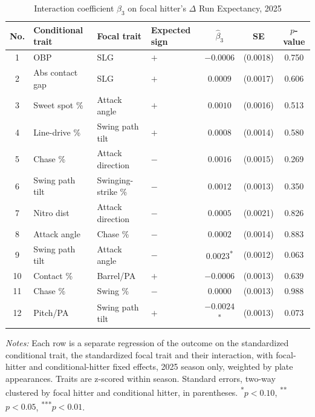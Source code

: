 \begin{table}[htbp]
\centering
\small
\caption{Interaction coefficient $\beta_3$ on focal hitter's $\Delta$ Run Expectancy, 2025}
\label{tab:table1_focal_2025}
\begin{tabular}{clllccc}
\toprule
No. & Conditional trait & Focal trait & Expected sign & $\hat\beta_3$ & SE & $p$-value \\
\midrule
1 & OBP & SLG & $+$ & $-0.0006$ & (0.0018) & 0.750 \\
2 & Abs contact gap & SLG & $+$ & $0.0009$ & (0.0017) & 0.606 \\
3 & Sweet spot \% & Attack angle & $+$ & $0.0010$ & (0.0016) & 0.513 \\
4 & Line-drive \% & Swing path tilt & $+$ & $0.0008$ & (0.0014) & 0.580 \\
5 & Chase \% & Attack direction & $-$ & $0.0016$ & (0.0015) & 0.269 \\
6 & Swing path tilt & Swinging-strike \% & $-$ & $0.0012$ & (0.0013) & 0.350 \\
7 & Nitro dist & Attack direction & $-$ & $0.0005$ & (0.0021) & 0.826 \\
8 & Attack angle & Chase \% & $-$ & $0.0002$ & (0.0014) & 0.883 \\
9 & Swing path tilt & Attack angle & $-$ & $0.0023$\textsuperscript{*} & (0.0012) & 0.063 \\
10 & Contact \% & Barrel/PA & $+$ & $-0.0006$ & (0.0013) & 0.639 \\
11 & Chase \% & Swing \% & $-$ & $0.0000$ & (0.0013) & 0.988 \\
12 & Pitch/PA & Swing path tilt & $+$ & $-0.0024$\textsuperscript{*} & (0.0013) & 0.073 \\
\bottomrule
\end{tabular}
\par\smallskip\parbox{0.95\textwidth}{\footnotesize \textit{Notes:} Each row is a separate regression of the outcome on the standardized conditional trait, the standardized focal trait and their interaction, with focal-hitter and conditional-hitter fixed effects, 2025 season only, weighted by plate appearances. Traits are z-scored within season. Standard errors, two-way clustered by focal hitter and conditional hitter, in parentheses. \textsuperscript{*}$p<0.10$, \textsuperscript{**}$p<0.05$, \textsuperscript{***}$p<0.01$.}
\end{table}
